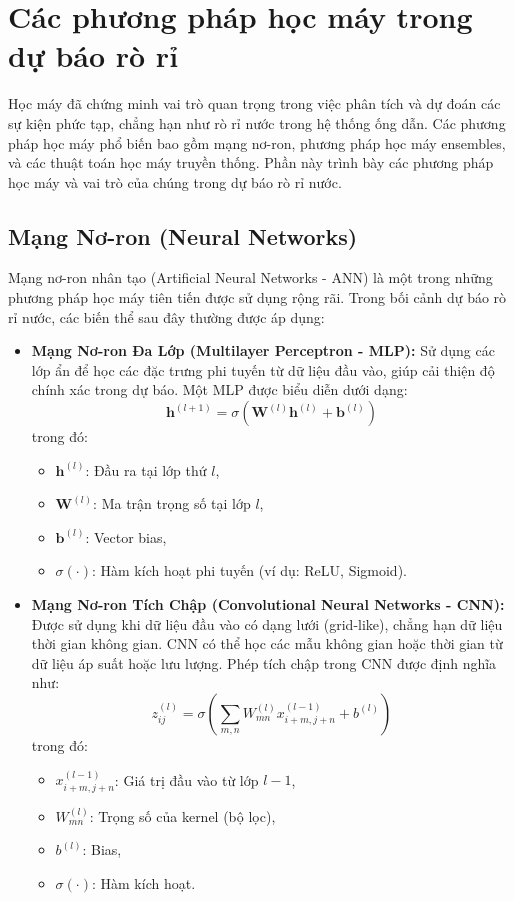 \section{Các phương pháp học máy trong dự báo rò rỉ}
\label{sec:ml_methods}

Học máy đã chứng minh vai trò quan trọng trong việc phân tích và dự đoán các sự kiện phức tạp, chẳng hạn như rò rỉ nước trong hệ thống ống dẫn. Các phương pháp học máy phổ biến bao gồm mạng nơ-ron, phương pháp học máy ensembles, và các thuật toán học máy truyền thống. Phần này trình bày các phương pháp học máy và vai trò của chúng trong dự báo rò rỉ nước.

\subsection{Mạng Nơ-ron (Neural Networks)}
Mạng nơ-ron nhân tạo (Artificial Neural Networks - ANN) là một trong những phương pháp học máy tiên tiến được sử dụng rộng rãi. Trong bối cảnh dự báo rò rỉ nước, các biến thể sau đây thường được áp dụng:

\begin{itemize}
    \item \textbf{Mạng Nơ-ron Đa Lớp (Multilayer Perceptron - MLP):} Sử dụng các lớp ẩn để học các đặc trưng phi tuyến từ dữ liệu đầu vào, giúp cải thiện độ chính xác trong dự báo. Một MLP được biểu diễn dưới dạng:
    \[
    \mathbf{h}^{(l+1)} = \sigma(\mathbf{W}^{(l)} \mathbf{h}^{(l)} + \mathbf{b}^{(l)})
    \]
    trong đó:
    \begin{itemize}
        \item \(\mathbf{h}^{(l)}\): Đầu ra tại lớp thứ \(l\),
        \item \(\mathbf{W}^{(l)}\): Ma trận trọng số tại lớp \(l\),
        \item \(\mathbf{b}^{(l)}\): Vector bias,
        \item \(\sigma(\cdot)\): Hàm kích hoạt phi tuyến (ví dụ: ReLU, Sigmoid).
    \end{itemize}
    
    \item \textbf{Mạng Nơ-ron Tích Chập (Convolutional Neural Networks - CNN):} Được sử dụng khi dữ liệu đầu vào có dạng lưới (grid-like), chẳng hạn dữ liệu thời gian không gian. CNN có thể học các mẫu không gian hoặc thời gian từ dữ liệu áp suất hoặc lưu lượng. Phép tích chập trong CNN được định nghĩa như:
    \[
    z_{ij}^{(l)} = \sigma\left(\sum_{m,n} W_{mn}^{(l)} x_{i+m,j+n}^{(l-1)} + b^{(l)}\right)
    \]
    trong đó:
    \begin{itemize}
        \item \(x_{i+m,j+n}^{(l-1)}\): Giá trị đầu vào từ lớp \(l-1\),
        \item \(W_{mn}^{(l)}\): Trọng số của kernel (bộ lọc),
        \item \(b^{(l)}\): Bias,
        \item \(\sigma(\cdot)\): Hàm kích hoạt.
    \end{itemize}
\end{itemize}

